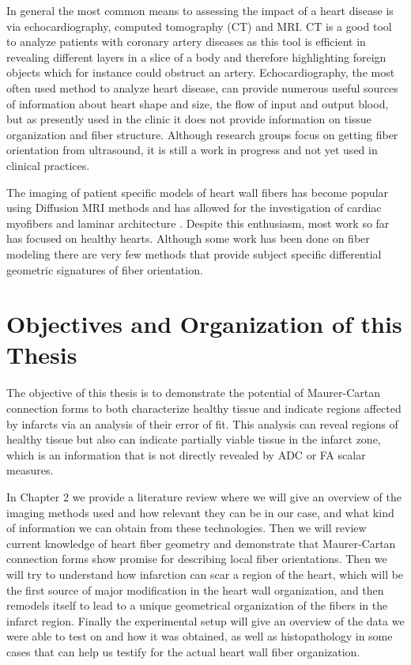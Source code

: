 In general the most common means to assessing the impact of a heart disease is via echocardiography, computed tomography (CT) and MRI. CT is a good tool to analyze patients with coronary artery diseases as this tool is efficient in revealing different layers in a slice of a body and therefore highlighting foreign objects which for instance could obstruct an artery. Echocardiography, the most often used method to analyze heart disease, can provide numerous useful sources of information about heart shape and size, the flow of input and output blood, but as presently used in the clinic it does not provide information on tissue organization and fiber structure. Although research groups focus on getting fiber orientation from ultrasound, it is still a work in progress and not yet used in clinical practices.

The imaging of patient specific models of heart wall fibers has become popular using Diffusion MRI methods and has allowed for the investigation of cardiac myofibers and laminar architecture \cite{rademakers1994relation, helm2005measuring, rohmer2007reconstruction}. Despite this enthusiasm, most work so far has focused on healthy hearts. Although some work has been done on fiber modeling \cite{pami2015, savadjiev2012heart} there are very few methods that provide subject specific differential geometric signatures of fiber orientation.

\section{Objectives and Organization of this Thesis}

The objective of this thesis is to demonstrate the potential of Maurer-Cartan connection forms to both characterize healthy tissue and indicate regions affected by infarcts via an analysis of their error of fit. This analysis can reveal regions of healthy tissue but also can indicate partially viable tissue in the infarct zone, which is an information that is not directly revealed by ADC or FA scalar measures.

In Chapter 2 we provide a literature review where we will give an overview of the imaging methods used and how relevant they can be in our case, and what kind of information we can obtain from these technologies. Then we will review current knowledge of heart fiber geometry and demonstrate that Maurer-Cartan connection forms show promise for describing local fiber orientations. Then we will try to understand how infarction can scar a region of the heart, which will be the first source of major modification in the heart wall organization, and then remodels itself to lead to a unique geometrical organization of the fibers in the infarct region. Finally the experimental setup will give an overview of the data we were able to test on and how it was obtained, as well as histopathology in some cases that can help us testify for the actual heart wall fiber organization.

